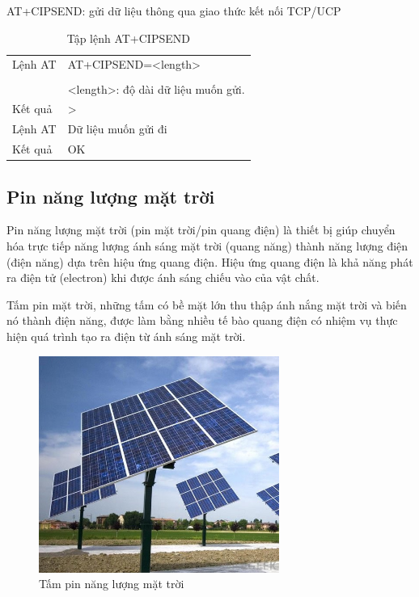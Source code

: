 AT+CIPSEND: gửi dữ liệu thông qua giao thức kết nối TCP/UCP
\begin{table}[H]
\label{table:AT+CIPSEND}
\begin{tabular}{|l|l|}
\hline
Lệnh AT & AT+CIPSEND=<length> \\ 
& \\
& <length>: độ dài dữ liệu muốn gửi.\\\hline
Kết quả  & >  \\ \hline
Lệnh AT & Dữ liệu muốn gửi đi \\ \hline
Kết quả  & OK  \\ \hline
\end{tabular}

\caption[Tập lệnh AT+CIPSEND: gửi dữ liệu qua giao thức TCP/UCP]{Tập lệnh AT+CIPSEND}
\end{table}










\newpage
\subsection{Pin năng lượng mặt trời}
Pin năng lượng mặt trời (pin mặt trời/pin quang điện) là thiết bị giúp chuyển hóa trực tiếp năng lượng ánh sáng mặt trời (quang năng) thành năng lượng điện (điện năng) dựa trên hiệu ứng quang điện. Hiệu ứng quang điện là khả năng phát ra điện tử (electron) khi được ánh sáng chiếu vào của vật chất.

Tấm pin mặt trời, những tấm có bề mặt lớn thu thập ánh nắng mặt trời và biến nó thành điện năng, được làm bằng nhiều tế bào quang điện có nhiệm vụ thực hiện quá trình tạo ra điện từ ánh sáng mặt trời.
\begin{figure}[H]
\centering    
\includegraphics[width=0.7\textwidth]{solarpanel}
\caption[Tấm pin năng lượng mặt trời]{Tấm pin năng lượng mặt trời}
\label{fig:solarpanel}
\end{figure}

